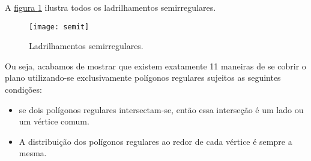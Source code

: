 A \hyperref[semit]{figura \ref{semit}} ilustra todos os ladrilhamentos semirregulares.


\begin{figure}[H]
\centering
\texttt{[image: semit]}
\caption{Ladrilhamentos semirregulares.}
\label{semit}
\end{figure}

Ou seja, acabamos de mostrar que existem exatamente 11 maneiras de se cobrir o plano utilizando-se exclusivamente polígonos regulares sujeitos as seguintes condições:
\begin{itemize}
\item se dois polígonos regulares intersectam-se, então essa interseção é um lado ou um vértice comum.
\item A distribuição dos polígonos regulares ao redor de cada vértice é sempre a mesma.
\end{itemize}



